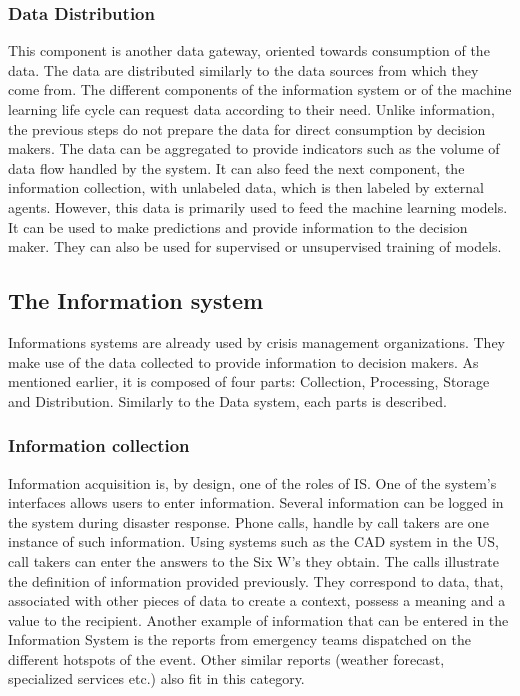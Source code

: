 \subsubsection{Data Distribution}
This component is another data gateway, oriented towards consumption of the data.
The data are distributed similarly to the data sources from which they come from.
The different components of the information system or of the machine learning life cycle can request data according to their need.
Unlike information, the previous steps do not prepare the data for direct consumption by decision makers.
The data can be aggregated to provide indicators such as the volume of data flow handled by the system.
It can also feed the next component, the information collection, with unlabeled data, which is then labeled by external agents.
However, this data is primarily used to feed the machine learning models.
It can be used to make predictions and provide information to the decision maker.
They can also be used for supervised or unsupervised training of models.

\subsection{The Information system}
Informations systems are already used by crisis management organizations.
They make use of the data collected to provide information to decision makers.
As mentioned earlier, it is composed of four parts: Collection, Processing, Storage and Distribution.
Similarly to the Data system, each parts is described.

\subsubsection{Information collection}
Information acquisition is, by design, one of the roles of IS.
One of the system's interfaces allows users to enter information.
Several information can be logged in the system during disaster response.
Phone calls, handle by call takers are one instance of such information.
Using systems such as the CAD system in the US, call takers can enter the answers to the
Six W's they obtain.
The calls illustrate the definition of information provided previously.
They correspond to data, that, associated with other pieces of data to create a context,
possess a meaning and a value to the recipient.
Another example of information that can be entered in the Information System is the
reports from emergency teams dispatched on the different hotspots of the event.
Other similar reports (weather forecast, specialized services etc.) also fit in this category.

